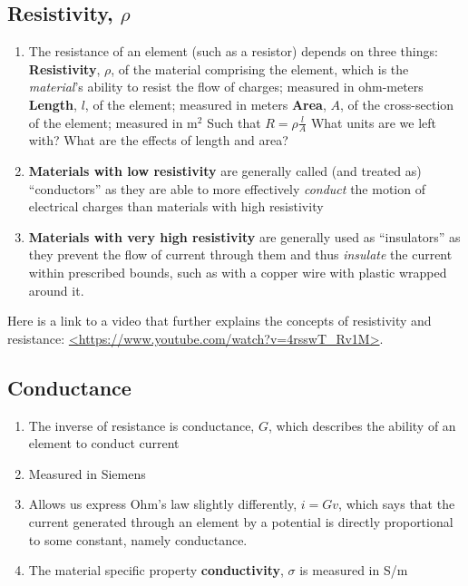\documentclass[11pt]{book}
\begin{document}
\subsection{Resistivity, $\rho$}
\begin{enumerate}
	\item The resistance of an element (such as a resistor) depends on three things: 
	\subitem \textbf{Resistivity}, $\rho$, of the material comprising the element, which is the \textit{material}'s ability to resist the flow of charges; measured in ohm-meters
	\subitem \textbf{Length}, $l$, of the element; measured in meters
	\subitem \textbf{Area}, $A$, of the cross-section of the element; measured in m$^2$
	\subitem Such that $R = \rho\frac{l}{A}$
	\subsubitem What units are we left with?
	\subsubitem What are the effects of length and area?
	\item \textbf{Materials with low resistivity} are generally called (and treated as) ``conductors'' as they are able to more effectively \textit{conduct} the motion of electrical charges than materials with high resistivity
	\item \textbf{Materials with very high resistivity} are generally used as ``insulators'' as they prevent the flow of current through them and thus \textit{insulate} the current within prescribed bounds, such as with a copper wire with plastic wrapped around it.
\end{enumerate}

Here is a link to a video that further explains the concepts of resistivity and resistance: \url{<https://www.youtube.com/watch?v=4rsswT_Rv1M>}.

\subsection{Conductance}
\begin{enumerate}
	\item The inverse of resistance is conductance, $G$, which describes the ability of an element to conduct current
	\item Measured in Siemens
	\item Allows us express Ohm's law slightly differently, $i = Gv$, which says that the current generated through an element by a potential is directly proportional to some constant, namely conductance.
	\item The material specific property \textbf{conductivity}, $\sigma$ is measured in S/m
\end{enumerate}
\end{document}
